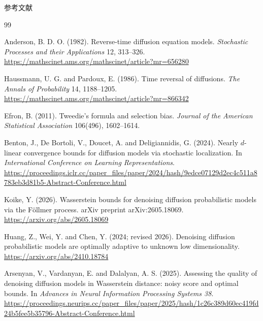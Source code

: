 \documentclass[11pt]{beamer}
\begin{document}
\appendix
{}
\begin{frame}[allowframebreaks]{参考文献}
  \small
  \begin{thebibliography}{99}

      Anderson, B. D. O. (1982).
      Reverse-time diffusion equation models.
      \textit{Stochastic Processes and their Applications} 12, 313--326.
      \url{https://mathscinet.ams.org/mathscinet/article?mr=656280}

      Haussmann, U. G. and Pardoux, E. (1986).
      Time reversal of diffusions.
      \textit{The Annals of Probability} 14, 1188--1205.
      \url{https://mathscinet.ams.org/mathscinet/article?mr=866342}

      Efron, B. (2011).
      Tweedie's formula and selection bias.
      \textit{Journal of the American Statistical Association} 106(496), 1602--1614.

      Benton, J., De Bortoli, V., Doucet, A. and Deligiannidis, G. (2024).
      Nearly $d$-linear convergence bounds for diffusion models via stochastic localization.
      In \textit{International Conference on Learning Representations}.
      \url{https://proceedings.iclr.cc/paper_files/paper/2024/hash/9edce07129d2ec4c511a8783eb3d81b5-Abstract-Conference.html}

      Koike, Y. (2026).
      Wasserstein bounds for denoising diffusion probabilistic models via
      the F\"ollmer process.
      arXiv preprint arXiv:2605.18069.
      \url{https://arxiv.org/abs/2605.18069}

      Huang, Z., Wei, Y. and Chen, Y. (2024; revised 2026).
      Denoising diffusion probabilistic models are optimally adaptive to unknown low dimensionality.
      \url{https://arxiv.org/abs/2410.18784}

      Arsenyan, V., Vardanyan, E. and Dalalyan, A. S. (2025).
      Assessing the quality of denoising diffusion models in Wasserstein distance:
      noisy score and optimal bounds.
      In \textit{Advances in Neural Information Processing Systems 38}.
      \url{https://proceedings.neurips.cc/paper_files/paper/2025/hash/1c26c389d60ec419fd24b5fee5b35796-Abstract-Conference.html}


\end{thebibliography}
\end{frame}
\end{document}
